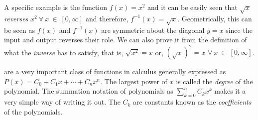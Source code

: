 A specific example is the function $f(x)=x^2$ and it can be easily seen that $\sqrt{x}$ \textit{reverses} $x^2 ~\forall~x~\in~[0,\infty] $ and therefore, $f^{-1}(x)=\sqrt{x}$. Geometrically, this can be seen as $f(x)$ and $f^{-1}(x)$ are symmetric about the diagonal $y=x$ since the input and output reverses their role. We can also prove it from the definition of what the \textit{inverse} has to satisfy, that is, $\sqrt{x^2}=x$ or, $(\sqrt{x})^2=x$ $\forall~x~\in~[0,\infty]$.

 are a very important class of functions in calculus generally expressed as $P(x) = C_0 + C_1x + \cdots + C_nx^n$. The largest power of $x$ is called the \textit{degree} of the polynomial. The summation notation of polynomials as $\sum_{k=0}^n C_kx^k$ makes it a very simple way of writing it out. The $C_k$ are constants known as the \textit{coefficients} of the polynomials.